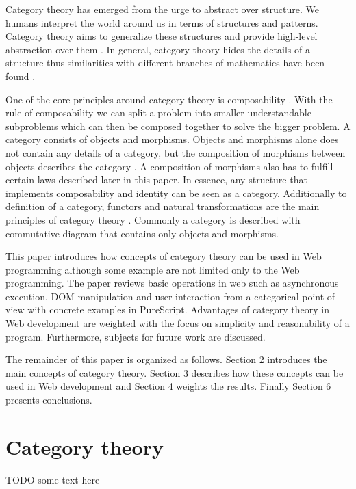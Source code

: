 \documentclass[article]{aaltoseries}
\begin{document}
  Category theory has emerged from the urge to abstract over structure. We
  humans interpret the world around us in terms of structures and patterns.
  Category theory aims to generalize these structures and provide high-level
  abstraction over them \cite{eilenberg1945general}. In general, category theory
  hides the details of a structure thus similarities with different branches of
  mathematics have been found \cite{lawvere1996adjointness}.

  One of the core principles around category theory is composability
  \cite{barr1990category}. With the rule of composability we can split a problem
  into smaller understandable subproblems which can then be composed together to
  solve the bigger problem. A category consists of objects and morphisms.
  Objects and morphisms alone does not contain any details of a category, but
  the composition of morphisms between objects describes the category
  \cite{computational, barr1990category}. A composition of morphisms also has to
  fulfill certain laws described later in this paper. In essence, any structure
  that implements composability and identity can be seen as a category.
  Additionally to definition of a category, functors and natural transformations
  are the main principles of category theory \cite{awodey2006category,
    computational}. Commonly a category is described with commutative diagram
  that contains only objects and morphisms.
 
  This paper introduces how concepts of category theory can be used in Web
  programming although some example are not limited only to the Web programming.
  The paper reviews basic operations in web such as asynchronous execution, DOM
  manipulation and user interaction from a categorical point of view with
  concrete examples in PureScript. Advantages of category theory in Web
  development are weighted with the focus on simplicity and reasonability of a
  program. Furthermore, subjects for future work are discussed.
 
  The remainder of this paper is organized as follows. Section 2 introduces the
  main concepts of category theory. Section 3 describes how these concepts can
  be used in Web development and Section 4 weights the results. Finally Section
  6 presents conclusions.


\section{Category theory}
TODO some text here
\end{document}
